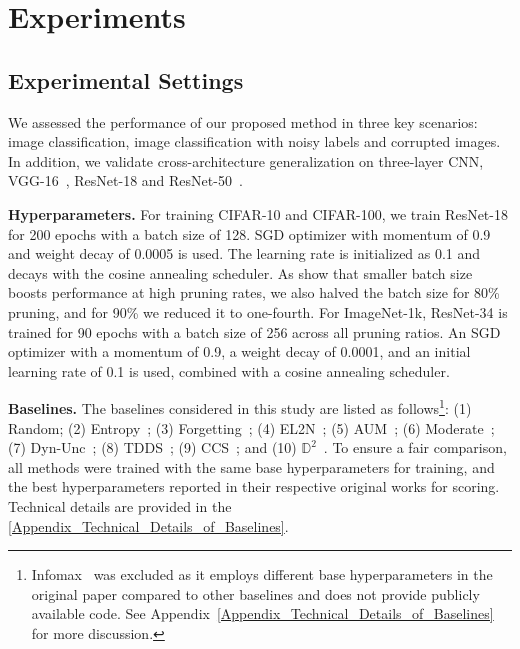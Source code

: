 \section{Experiments}
\label{sec:experiment}


\subsection{Experimental Settings}
We assessed the performance of our proposed method in three key scenarios: image classification, image classification with noisy labels and corrupted images. In addition, we validate cross-architecture generalization on three-layer CNN, VGG-16~\citep{simonyan2015deepconvolutionalnetworkslargescale}, ResNet-18 and ResNet-50~\citep{he2015deepresiduallearningimage}.

\textbf{Hyperparameters.}
For training CIFAR-10 and CIFAR-100, we train ResNet-18 for 200 epochs with a batch size of 128. SGD optimizer with momentum of 0.9 and weight decay of 0.0005 is used. The learning rate is initialized as 0.1 and decays with the cosine annealing scheduler. As \citet{zhang2024spanning} show that smaller batch size boosts performance at high pruning rates, we also halved the batch size for 80\% pruning, and for 90\% we reduced it to one-fourth. For ImageNet-1k, ResNet-34 is trained for 90 epochs with a batch size of 256 across all pruning ratios. An SGD optimizer with a momentum of 0.9, a weight decay of 0.0001, and an initial learning rate of 0.1 is used, combined with a cosine annealing scheduler.

\textbf{Baselines.} The baselines considered in this study are listed as follows\footnote{Infomax~\citep{tan2025data} was excluded as it employs different base hyperparameters in the original paper compared to other baselines and does not provide publicly available code. See Appendix~\ref{Appendix_Technical_Details_of_Baselines} for more discussion.}: (1) Random; (2) Entropy~\citep{coleman2020selectionproxyefficientdata}; (3) Forgetting~\citep{toneva2018empirical}; (4) EL2N~\citep{gordon2021data}; (5) AUM~\citep{pleiss2020identifyingmislabeleddatausing}; (6) Moderate~\citep{xia2022moderate}; (7) Dyn-Unc~\citep{he2024large}; (8) TDDS~\citep{zhang2024spanning}; (9) CCS\mbox{~\citep{zheng2022coverage}}; and (10) $\mathbb{D}^2$~\citep{maharana2023d2}. To ensure a fair comparison, all methods were trained with the same base hyperparameters for training, and the best hyperparameters reported in their respective original works for scoring. Technical details are provided in the \cref{Appendix_Technical_Details_of_Baselines}. 


